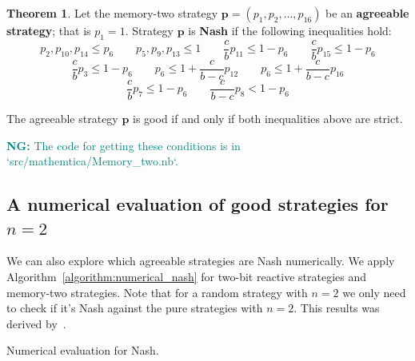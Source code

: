 \documentclass{article}
\theoremstyle{definition}
\newtheorem{theorem}{Theorem}[section]
\newcommand{\nikoleta}[1]{\textcolor{teal}{{\bf NG:} #1}}
\begin{document}
\begin{theorem}\label{theorem:memory_two_nash_and_good}
  Let the memory-two strategy \(\mathbf{p} = (p_{1}, p_{2}, \dots, p_{16})\) be an \textbf{agreeable
  strategy}; that is \(p_1 = 1\). Strategy \(\mathbf{p}\) is \textbf{Nash} if the
  following inequalities hold:
  \begin{equation*}
      p_2, p_{10}, p_{14}  \leq  p_{6}  \qquad  p_5, p_9, p_{13}  \leq 1 \qquad  \frac{c}{b} p_{11} \leq 1 - p_{6}  \qquad  \frac{c}{b} p_{15} \leq 1 - p_{6} 
  \end{equation*}
  \begin{equation*}
      \frac{c}{b} p_{3} \leq 1 - p_{6}  \qquad  p_6  \leq 1 + \frac{c}{b - c} p_{12} \qquad  p_6  \leq 1 + \frac{c}{b - c} p_{16}
  \end{equation*}
  \begin{equation*}
        \frac{c}{b} p_{7} \leq 1 - p_6  \qquad \frac{c}{b -c} p_{8} < 1 - p_6
  \end{equation*}

  The agreeable strategy \(\mathbf{p}\) is good if and only if both inequalities above are strict.
\end{theorem}

\nikoleta{The code for getting these conditions is in `src/mathemtica/Memory\_two.nb`.}

\subsection{A numerical evaluation of good strategies for
\(n=2\)}\label{section:good_strategies_numerically}

We can also explore which agreeable strategies are Nash numerically. We apply
Algorithm~\ref{algorithm:numerical_nash} for two-bit reactive strategies
and memory-two strategies. Note that for a random strategy with \(n=2\)
we only need to check if it's Nash against the pure strategies with \(n=2\).
This results was derived by~\cite{}.

\begin{algorithm}[H]
  \SetAlgoLined {}
  \caption{Numerical evaluation for Nash.}\label{algorithm:numerical_nash}
\end{algorithm}
\end{document}

